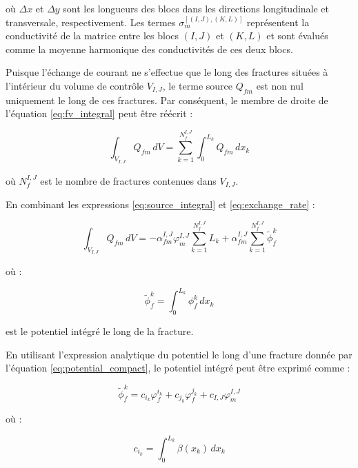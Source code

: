 où $\Delta x$ et $\Delta y$ sont les longueurs des blocs dans les directions longitudinale et transversale, respectivement. Les termes $\sigma_m^{[(I,J),(K,L)]}$ représentent la conductivité de la matrice entre les blocs $(I,J)$ et $(K,L)$ et sont évalués comme la moyenne harmonique des conductivités de ces deux blocs.

Puisque l'échange de courant ne s'effectue que le long des fractures situées à l'intérieur du volume de contrôle $V_{I,J}$, le terme source $Q_{fm}$ est non nul uniquement le long de ces fractures. Par conséquent, le membre de droite de l'équation \eqref{eq:fv_integral} peut être réécrit :

\begin{equation}
\int_{V_{I,J}} Q_{fm} \, dV = \sum_{k=1}^{N_f^{I,J}} \int_0^{L_k} Q_{fm} \, dx_k
\label{eq:source_integral}
\end{equation}

où $N_f^{I,J}$ est le nombre de fractures contenues dans $V_{I,J}$.

En combinant les expressions \eqref{eq:source_integral} et \eqref{eq:exchange_rate} :

\begin{equation}
\int_{V_{I,J}} Q_{fm} \, dV = -\alpha_{fm}^{I,J} \varphi_m^{I,J} \sum_{k=1}^{N_f^{I,J}} L_k + \alpha_{fm}^{I,J} \sum_{k=1}^{N_f^{I,J}} \tilde{\phi}_f^k
\label{eq:source_combined}
\end{equation}

où :

\begin{equation}
\tilde{\phi}_f^k = \int_0^{L_k} \phi_f^k \, dx_k
\label{eq:integrated_potential}
\end{equation}

est le potentiel intégré le long de la fracture.

En utilisant l'expression analytique du potentiel le long d'une fracture donnée par l'équation \eqref{eq:potential_compact}, le potentiel intégré peut être exprimé comme :

\begin{equation}
\tilde{\phi}_f^k = c_{i_k} \varphi_f^{i_k} + c_{j_k} \varphi_f^{j_k} + c_{I,J} \varphi_m^{I,J}
\label{eq:integrated_potential_form}
\end{equation}

où :

\begin{equation}
c_{i_k} = \int_0^{L_k} \beta(x_k) \, dx_k
\label{eq:cik}
\end{equation}

